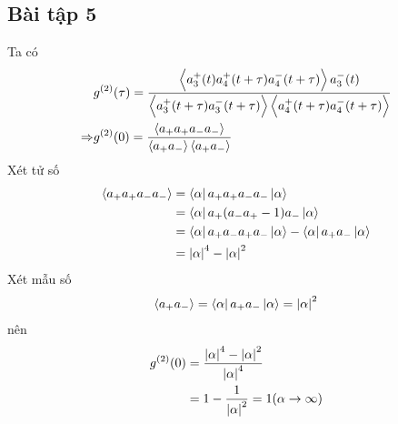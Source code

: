 \documentclass{report}
\newcommand{\f}[2]{\dfrac{#1}{#2}}
\begin{document}
\subsection*{Bài tập 5}
Ta có
\begin{align*}
	&g^{(2)}(\tau) = \f{\ev{a_{3}^{+}(t) a_{4}^{+}(t + \tau) a_{4}^{-}(t + \tau)} a_{3}^{-}(t)}{\ev{a_{3}^{+}(t+ \tau) a_{3}^{-}(t+ \tau)} \ev{a_{4}^{+}(t + \tau) a_{4}^{-}(t+ \tau) }}\\
	\Rightarrow & g^{(2)}(0) = \f{\ev{a_{+} a_{+} a_{-} a_{-}}}{\ev{a_{+} a_{-}} \ev{a_{+} a_{-}}}
\end{align*}
Xét tử số
\begin{align*}
	\ev{a_{+} a_{+} a_{-} a_{-}} 
	&= \bra{\alpha} a_{+} a_{+} a_{-} a_{-} \ket{\alpha}\\
	&= \bra{\alpha} a_{+} ( a_{-} a_{+} - 1) a_{-} \ket{\alpha}\\
	&= \bra{\alpha} a_{+} a_{-} a_{+}  a_{-} \ket{\alpha} - \bra{\alpha} a_{+} a_{-} \ket{\alpha}\\
	&= \abs{\alpha}^{4} - \abs{\alpha}^{2}
\end{align*}	
Xét mẫu số
\begin{align*}
	\ev{a_{+} a_{-}} = \bra{\alpha} a_{+} a_{-} \ket{\alpha} = \abs{\alpha}^{2}
\end{align*}	
nên 
\begin{align*}
	g^{(2)}(0)
	&= \f{\abs{\alpha}^{4} - \abs{\alpha}^{2}}{\abs{\alpha}^{4}}\\
	&= 1 - \f{1}{\abs{\alpha}^{2}} = 1 ( \alpha \rightarrow \infty)
\end{align*}	
	
	
	
	
	
	
	
	
	
	
	
	
	
	
	
\end{document}

